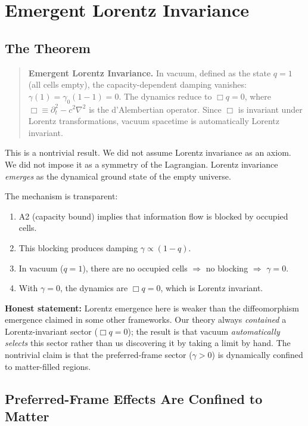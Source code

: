 \documentclass[aps,prd,twocolumn,showpacs,superscriptaddress,preprintnumbers]{revtex4-2}
\begin{document}
\section{Emergent Lorentz Invariance}
\label{sec:lorentz}

\subsection{The Theorem}

\begin{quote}
\textbf{Emergent Lorentz Invariance.}
In vacuum, defined as the state $q=1$ (all cells empty), the capacity-dependent damping vanishes: $\gamma(1)=\gamma_0(1-1)=0$.
The dynamics reduce to $\Box q=0$, where $\Box\equiv\partial_t^2-c^2\nabla^2$ is the d'Alembertian operator.
Since $\Box$ is invariant under Lorentz transformations, vacuum spacetime is automatically Lorentz invariant.
\end{quote}

This is a nontrivial result.
We did not assume Lorentz invariance as an axiom.
We did not impose it as a symmetry of the Lagrangian.
Lorentz invariance \emph{emerges} as the dynamical ground state of the empty universe.

The mechanism is transparent:
\begin{enumerate}
    \item A2 (capacity bound) implies that information flow is blocked by occupied cells.
    \item This blocking produces damping $\gamma\propto(1-q)$.
    \item In vacuum ($q=1$), there are no occupied cells $\Rightarrow$ no blocking $\Rightarrow$ $\gamma=0$.
    \item With $\gamma=0$, the dynamics are $\Box q=0$, which is Lorentz invariant.
\end{enumerate}

\textbf{Honest statement:} Lorentz emergence here is weaker than the diffeomorphism emergence claimed in some other frameworks.
Our theory always \emph{contained} a Lorentz-invariant sector ($\Box q=0$); the result is that vacuum \emph{automatically selects} this sector rather than us discovering it by taking a limit by hand.
The nontrivial claim is that the preferred-frame sector ($\gamma>0$) is dynamically confined to matter-filled regions.

\subsection{Preferred-Frame Effects Are Confined to Matter}
\end{document}
